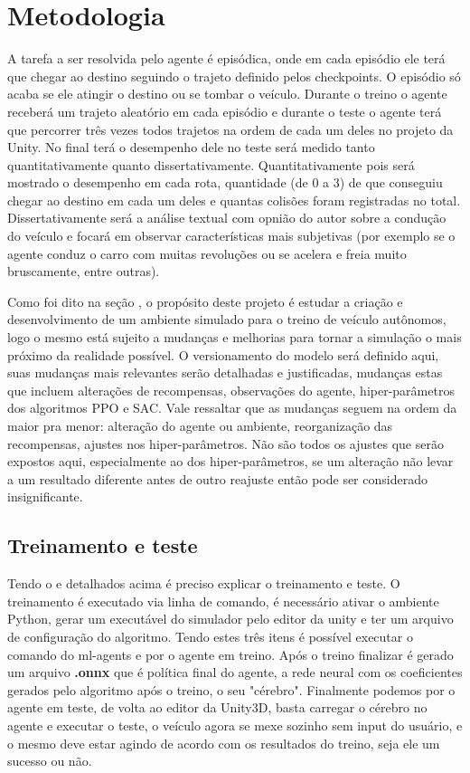 \section{Metodologia}
A tarefa a ser resolvida pelo agente é episódica, onde em cada episódio ele terá que chegar ao destino seguindo o trajeto definido pelos checkpoints. O episódio só acaba se ele atingir o destino ou se tombar o veículo. Durante o treino o agente receberá um trajeto aleatório em cada episódio e durante o teste o agente terá que percorrer três vezes todos trajetos na ordem de cada um deles no projeto da Unity. No final terá o desempenho dele no teste será medido tanto quantitativamente quanto dissertativamente. Quantitativamente pois será mostrado o desempenho em cada rota, quantidade (de 0 a 3) de que conseguiu chegar ao destino em cada um deles e quantas colisões foram registradas no total. Dissertativamente será a análise textual com opnião do autor sobre a condução do veículo e focará em observar características mais subjetivas (por exemplo se o agente conduz o carro com muitas revoluções ou se acelera e freia muito bruscamente, entre outras). 

Como foi dito na seção , o propósito deste projeto é estudar a criação e desenvolvimento de um ambiente simulado para o treino de veículo autônomos, logo o mesmo está sujeito a mudanças e melhorias para tornar a simulação o mais próximo da realidade possível. O versionamento do modelo será definido aqui, suas mudanças mais relevantes serão detalhadas e justificadas, mudanças estas que incluem alterações de recompensas, observações do agente, hiper-parâmetros dos algoritmos PPO e SAC. Vale ressaltar que as mudanças seguem na ordem da maior pra menor: alteração do agente ou ambiente, reorganização das recompensas, ajustes nos hiper-parâmetros. Não são todos os ajustes que serão expostos aqui, especialmente ao dos hiper-parâmetros, se um alteração não levar a um resultado diferente antes de outro reajuste então pode ser considerado insignificante.

\subsection{Treinamento e teste}
Tendo o  e  detalhados acima é preciso explicar o treinamento e teste. O treinamento é executado via linha de comando, é necessário ativar o ambiente Python, gerar um executável do simulador pelo editor da unity e ter um arquivo de configuração do algoritmo. Tendo estes três itens é possível executar o comando do ml-agents e por o agente em treino. Após o treino finalizar é gerado um arquivo \textbf{.onnx} que é política final do agente, a rede neural com os coeficientes gerados pelo algoritmo após o treino, o seu "cérebro". Finalmente podemos por o agente em teste, de volta ao editor da Unity3D, basta carregar o cérebro no agente e executar o teste, o veículo agora se mexe sozinho sem input do usuário, e o mesmo deve estar agindo de acordo com os resultados do treino, seja ele um sucesso ou não.

